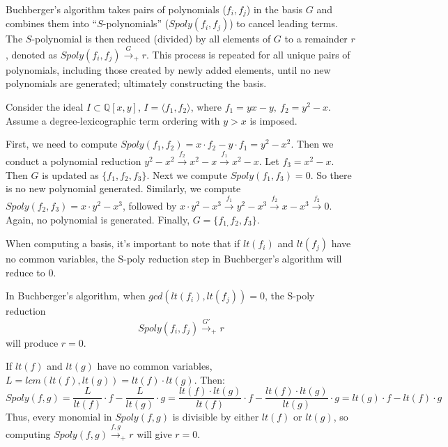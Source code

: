 Buchberger's algorithm takes pairs of polynomials ($f_{i}, f_{j}$) in 
the basis $G$ and combines them into ``$S$-polynomials'' 
($Spoly(f_{i}, f_{j})$) to cancel leading terms. The $S$-polynomial is then 
reduced (divided) by all elements of $G$ to a remainder $r$, denoted as  
$Spoly(f_{i}, f_{j}) \stackrel{G}{\textstyle\longrightarrow}_+r$. This
process is repeated for all unique pairs of polynomials, including
those created by newly added elements, until no new polynomials are
generated; ultimately constructing the \Grobner basis.
\begin{Example}\label{exp:gbsimple}
Consider the ideal $I \subset \mathbb{Q}[x, y]$, $I = \langle f_1, f_2 
\rangle$, where $f_1 = yx - y, ~f_2 = y^2 - x$. 
Assume a degree-lexicographic term ordering with $y > x$ is imposed. 

First, we need to compute $Spoly(f_{1},f_{2})=x\cdot f_{2}-y\cdot f_{1}=y^{2}-x^{2}$.
Then we conduct a polynomial reduction 
$y^{2}-x^{2}\stackrel{f_{2}}{\textstyle\longrightarrow}x^{2}-x \stackrel{f_{1}}{\textstyle\longrightarrow}x^{2}-x$.
Let $f_{3}=x^{2}-x$. Then $G$ is updated as $\{f_{1},f_{2},f_{3}\}$. Next we compute $Spoly(f_{1},f_{3})=0$. So there
is no new polynomial generated. Similarly, we compute $Spoly(f_{2},f_{3})=x\cdot y^{2}-x^{3}$, followed by 
$x\cdot y^{2}-x^{3}\stackrel{f_{1}}{\textstyle\longrightarrow}y^{2}-x^{3} \stackrel{f_{2}}{\textstyle\longrightarrow}x-x^{3}
\stackrel{f_{2}}{\textstyle\longrightarrow}0$. Again, no polynomial is generated. Finally, $G=\{f_{1,}f_{2},f_{3}\}$.

\end{Example}

When computing a \Grobner basis, it's important to note that if $lt(f_i)$ 
and $lt(f_j)$ have no common variables, the S-poly reduction step in 
Buchberger's algorithm will reduce to 0.
\begin{Lemma}
In Buchberger's algorithm, when $gcd(lt(f_i),lt(f_j)) = 0$, the S-poly reduction
$$Spoly(f_{i}, f_{j}) \stackrel{G'}{\textstyle\longrightarrow}_+r$$
will produce $r=0$.
\end{Lemma}

\begin{Proof}
If $lt(f)$ and $lt(g)$ have no common variables,  
$L=lcm(lt(f),lt(g))=lt(f)\cdot lt(g)$. Then: 
\begin{equation}
    Spoly(f,g)=\frac{L}{lt(f)}\cdot f - \frac{L}{lt(g)}\cdot g=
\frac{lt(f)\cdot lt(g)}{lt(f)}\cdot f - \frac{lt(f)\cdot lt(g)}{lt(g)}\cdot g
= lt(g)\cdot f - lt(f)\cdot g \nonumber
\end{equation}
Thus, every monomial in $Spoly(f, g)$ is divisible by either $lt(f)$ 
or $lt(g)$, so computing 
$Spoly(f, g) \stackrel{f,g}{\textstyle\longrightarrow}_+r$ will give $r=0$.
\end{Proof}

